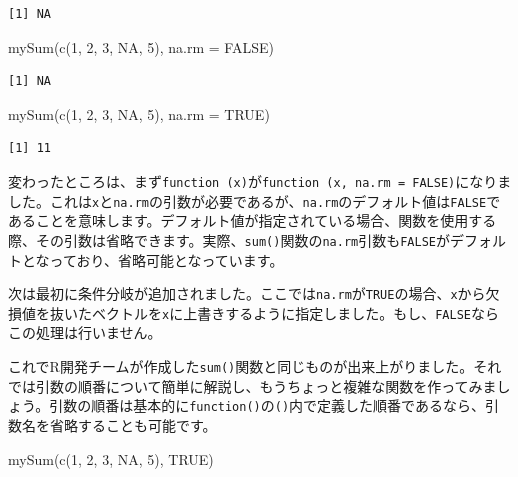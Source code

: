 \documentclass[
  a4paper,
  pandoc,
  ja=standard,
  jafont=haranoaji]{bxjsbook}
\newenvironment{Shaded}{\begin{snugshade}}{\end{snugshade}}
\newcommand{\AttributeTok}[1]{\textcolor[rgb]{0.00,0.48,0.65}{#1}}
\newcommand{\ConstantTok}[1]{\textcolor[rgb]{0.56,0.35,0.01}{#1}}
\newcommand{\DecValTok}[1]{\textcolor[rgb]{0.68,0.00,0.00}{#1}}
\newcommand{\FunctionTok}[1]{\textcolor[rgb]{0.28,0.35,0.67}{#1}}
\newcommand{\NormalTok}[1]{\textcolor[rgb]{0.00,0.48,0.65}{#1}}
\begin{document}
\begin{verbatim}
[1] NA
\end{verbatim}

\begin{Shaded}
\begin{Highlighting}[numbers=left,,]
\FunctionTok{mySum}\NormalTok{(}\FunctionTok{c}\NormalTok{(}\DecValTok{1}\NormalTok{, }\DecValTok{2}\NormalTok{, }\DecValTok{3}\NormalTok{, }\ConstantTok{NA}\NormalTok{, }\DecValTok{5}\NormalTok{), }\AttributeTok{na.rm =} \ConstantTok{FALSE}\NormalTok{)}
\end{Highlighting}
\end{Shaded}

\begin{verbatim}
[1] NA
\end{verbatim}

\begin{Shaded}
\begin{Highlighting}[numbers=left,,]
\FunctionTok{mySum}\NormalTok{(}\FunctionTok{c}\NormalTok{(}\DecValTok{1}\NormalTok{, }\DecValTok{2}\NormalTok{, }\DecValTok{3}\NormalTok{, }\ConstantTok{NA}\NormalTok{, }\DecValTok{5}\NormalTok{), }\AttributeTok{na.rm =} \ConstantTok{TRUE}\NormalTok{)}
\end{Highlighting}
\end{Shaded}

\begin{verbatim}
[1] 11
\end{verbatim}

変わったところは、まず\texttt{function\ (x)}が\texttt{function\ (x,\ na.rm\ =\ FALSE)}になりました。これは\texttt{x}と\texttt{na.rm}の引数が必要であるが、\texttt{na.rm}のデフォルト値は\texttt{FALSE}であることを意味します。デフォルト値が指定されている場合、関数を使用する際、その引数は省略できます。実際、\texttt{sum()}関数の\texttt{na.rm}引数も\texttt{FALSE}がデフォルトとなっており、省略可能となっています。

次は最初に条件分岐が追加されました。ここでは\texttt{na.rm}が\texttt{TRUE}の場合、\texttt{x}から欠損値を抜いたベクトルを\texttt{x}に上書きするように指定しました。もし、\texttt{FALSE}ならこの処理は行いません。

これでR開発チームが作成した\texttt{sum()}関数と同じものが出来上がりました。それでは引数の順番について簡単に解説し、もうちょっと複雑な関数を作ってみましょう。引数の順番は基本的に\texttt{function()}の\texttt{()}内で定義した順番であるなら、引数名を省略することも可能です。

\begin{Shaded}
\begin{Highlighting}[numbers=left,,]
\FunctionTok{mySum}\NormalTok{(}\FunctionTok{c}\NormalTok{(}\DecValTok{1}\NormalTok{, }\DecValTok{2}\NormalTok{, }\DecValTok{3}\NormalTok{, }\ConstantTok{NA}\NormalTok{, }\DecValTok{5}\NormalTok{), }\ConstantTok{TRUE}\NormalTok{)}
\end{Highlighting}
\end{Shaded}
\end{document}
